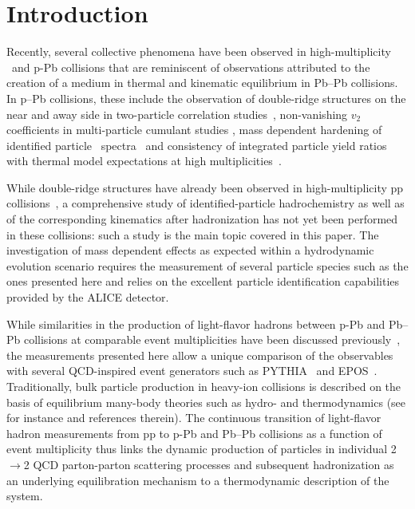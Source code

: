 \documentclass[ALICE,manyauthors]{cernphprep}
\begin{document}

\section{\label{secIntroduction}Introduction}



Recently, several collective phenomena have been observed in high-multiplicity \pp\ and p-Pb collisions that are reminiscent of observations attributed to the creation of a medium in thermal and kinematic equilibrium in Pb--Pb collisions. In p--Pb collisions, these include the observation of double-ridge structures on the near and away side in two-particle correlation studies~\cite{Abelev:2012ola}, non-vanishing $v_2$ coefficients in multi-particle cumulant studies \cite{Khachatryan:2015waa}, mass dependent hardening of identified particle \pt\ spectra~\cite{ABELEV:2013wsa,Abelev:2013haa,Abelev:2014uua} and consistency of integrated particle yield ratios with thermal model expectations at high multiplicities~\cite{Adam:2015vsf}. 

While double-ridge structures have already been observed in high-multiplicity pp collisions~\cite{Aad:2015gqa}, a comprehensive study of
identified-particle hadrochemistry as well as of the corresponding kinematics after hadronization has not yet been performed in these
collisions: such a study is the main topic covered in this paper. The investigation of mass dependent effects as expected within a hydrodynamic 
evolution scenario requires the measurement of several particle species such as the ones presented here and relies on the excellent particle identification capabilities provided by the ALICE detector.

While similarities in the production of light-flavor hadrons between p-Pb and Pb--Pb collisions at comparable event multiplicities have been discussed previously~\cite{Abelev:2013haa,Adam:2015vsf}, the measurements presented here allow a unique comparison of the observables with several QCD-inspired event generators such as PYTHIA~\cite{Skands:2014pea} and EPOS~\cite{Pierog:2013ria}. Traditionally, bulk particle production in heavy-ion collisions is described on the basis of equilibrium many-body theories such as hydro- and thermodynamics (see for instance \cite{deSouza:2015ena,Andronic:2017pug} and references therein). The continuous transition of light-flavor hadron measurements from pp to p-Pb and Pb--Pb collisions as a function of event multiplicity thus links the dynamic production of particles in individual 2$\rightarrow$2 QCD parton-parton scattering processes and subsequent hadronization as an underlying equilibration mechanism to a thermodynamic description of the system.
\end{document}
